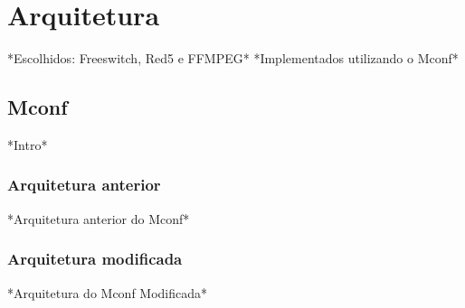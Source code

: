 \chapter{Arquitetura}\label{cha:implementacao}
	
    *Escolhidos: Freeswitch, Red5 e FFMPEG*
    *Implementados utilizando o Mconf*
    
\section{Mconf}\label{sec:mconf}

    *Intro*
    
\subsection{Arquitetura anterior}\label{sec:arquitetura-anterior}
	
	*Arquitetura anterior do Mconf*  
	
\subsection{Arquitetura modificada}\label{sec:arquitetura-modificada}
	
	*Arquitetura do Mconf Modificada*
	


